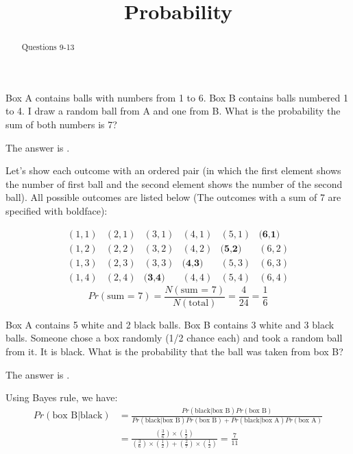 \documentclass{ximera}
\title{Probability}
\begin{document}
\begin{abstract}
  Questions 9-13
\end{abstract}
\maketitle


\begin{question}
Box A contains balls with numbers from 1 to 6.  Box B contains balls
numbered 1 to 4.  I draw a random ball from A and one from B.  What is
the probability the sum of both numbers is 7?
\begin{solution}
The answer is .
\end{solution}
Let's show each outcome with an ordered pair (in which the first
element shows the number of first ball and the second element shows
the number of the second ball). All possible outcomes are listed below
(The outcomes with a sum of 7 are specified with boldface):


\[
\begin{matrix}
(1,1) & (2,1) & (3,1) & (4,1) & (5,1) & \textbf{(6,1)} \\
(1,2) & (2,2) & (3,2) & (4,2) & \textbf{(5,2)} & (6,2) \\
(1,3) & (2,3) & (3,3) & \textbf{(4,3)} & (5,3) & (6,3) \\
(1,4) & (2,4) & \textbf{(3,4)} & (4,4) & (5,4) & (6,4)
\end{matrix}
\]
\[
Pr (\text{sum = 7}) = \frac{N(\text{sum = 7})}{N(\text{total})} =
\frac{4}{24} = \frac{1}{6}
\]
\end{question}

\begin{question}
Box A contains 5 white and 2 black balls.  Box B contains 3 white and
3 black balls.  Someone chose a box randomly (1/2 chance each) and
took a random ball from it.  It is black.  What is the probability
that the ball was taken from box B?
\begin{solution}
The answer is .
\end{solution}
Using Bayes rule, we have:
\begin{align*}
Pr (\text{box B} | \text{black}) &= \frac{Pr(\text{black} | \text{box B}) Pr(\text{box B})}{Pr(\text{black} | \text{box B}) Pr(\text{box B}) + Pr(\text{black} | \text{box A}) Pr(\text{box A})} \\
&=\frac{(\frac{3}{6}) \times (\frac{1}{2})}{(\frac{3}{6}) \times (\frac{1}{2}) + (\frac{2}{7}) \times (\frac{1}{2})} = \frac{7}{11}
\end{align*}
\end{question}
\end{document}
